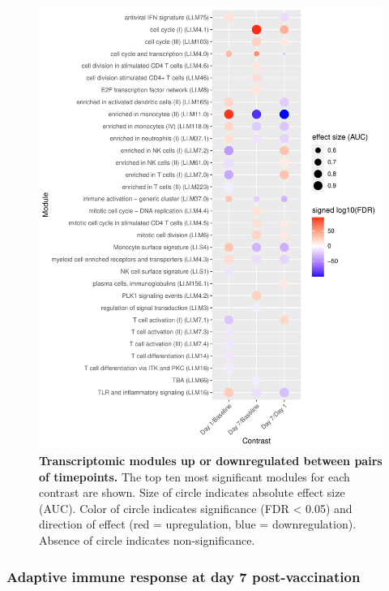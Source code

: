 \begin{figure}
    \includegraphics[width=1.0\textwidth]{mainmatter/figures/chapter_02/compare_dge_eqtl.tmodDotPlot.DGE.timepoint.pdf}
    \caption{
        \textbf{Transcriptomic modules up or downregulated between pairs of timepoints.}
        The top ten most significant modules for each contrast are shown.
        Size of circle indicates absolute effect size (\gls{AUC}). 
        Color of circle indicates significance (\gls{FDR} < 0.05) and direction of effect (red = upregulation, blue = downregulation).
        Absence of circle indicates non-significance.
    }
    \label{fig:hird_tmodDotPlot_timepoint}
\end{figure}

\subsubsection{Adaptive immune response at day 7 post-vaccination}
\label{subsec:hird_dge_adaptive_immune_day7}

